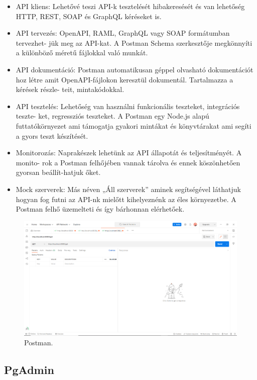 \begin{itemize}
\item API kliens: Lehetővé teszi API-k tesztelését hibakeresését és van lehetőség HTTP, REST, SOAP és GraphQL kéréseket is.
\item API tervezés: OpenAPI, RAML, GraphQL vagy SOAP formátumban tervezhet-
jük meg az API-kat. A Postman Schema szerkesztője megkönnyíti a különböző méretű fájlokkal való munkát.
\item API dokumentáció: Postman automatikusan géppel olvasható dokumentációt hoz létre amit OpenAPI-fájlokon keresztül dokumentál. Tartalmazza a kérések részle-
teit, mintakódokkal.
\item API tesztelés: Lehetőség van használni funkcionális teszteket, integrációs teszte-
ket, regressziós teszteket. A Postman egy Node.js alapú futtatókörnyezet ami támogatja gyakori mintákat és  könyvtárakat ami segíti a gyors teszt készítését.
\item Monitorozás: Naprakészek lehetünk az API állapotát és teljesítményét. A monito-
rok a Postman felhőjében vannak tárolva és ennek köszönhetően gyorsan beállít-hatjuk őket.
\item Mock szerverek: Más néven „Áll szerverek” aminek segítségével láthatjuk hogyan fog futni az API-nk mielőtt kihelyeznénk az éles környezetbe. A Postman felhő üzemelteti és így bárhonnan elérhetőek.
\end{itemize}

\begin{figure}[h]
\centering
\includegraphics[scale=1]{images/Postman.png}
\caption{Postman.}
\label{fig:Postman}
\end{figure}
\newpage

\subsection{PgAdmin}

